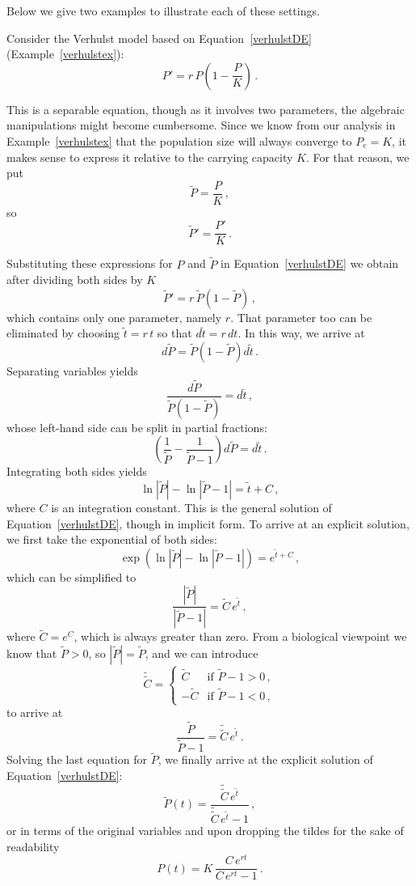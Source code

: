 Below we give two examples to illustrate each of these settings. 

\begin{example}
Consider the Verhulst model based on Equation~\eqref{verhulstDE} (Example~\ref{verhulstex}):
$$
P'=r\,P\left(1-\dfrac{P}{K}\right)\,.
$$

This is a separable equation, though as it involves two parameters, the algebraic manipulations might become cumbersome. Since we know from our analysis in Example~\ref{verhulstex} that the population size will always converge to $P_e=K$, it makes sense to express it relative to the carrying capacity $K$. For that reason, we put
$$
\widetilde{P}=\dfrac{P}{K}\,,
$$
so
$$
\widetilde{P}'=\dfrac{P'}{K}\,.
$$

Substituting these expressions for $P$ and $\widetilde{P}$ in  Equation~\eqref{verhulstDE} we obtain after dividing both sides by $K$
$$
\widetilde{P}'=r\,\widetilde{P}\left(1-\widetilde{P}\right)\,,
$$
which contains only one parameter, namely $r$. That parameter too can be eliminated by choosing $\tilde{t}=r\,t$ so that $d\tilde{t}=r\,d t$. In this way, we arrive at 
$$
d \widetilde{P}=\widetilde{P}\left(1-\widetilde{P}\right)d\tilde{t}\,.
$$
Separating variables yields
$$
\dfrac{d \widetilde{P}}{\widetilde{P}\left(1-\widetilde{P}\right)}=d\tilde{t}\,,
$$
whose left-hand side can be split in partial fractions:
$$
\left(\dfrac{1}{\widetilde{P}}-\dfrac{1}{\widetilde{P}-1}\right)d \widetilde{P}=d\tilde{t}\,.
$$
Integrating both sides yields
$$
\ln\left|\widetilde{P}\right|-\ln\left|\widetilde{P}-1\right|=\tilde{t}+C\,,
$$
where $C$ is an integration constant. This is the general solution of Equation~\eqref{verhulstDE}, though in implicit form. To arrive at an explicit solution, we first take the exponential of both sides:
$$
\exp\left(\ln\left|\widetilde{P}\right|-\ln\left|\widetilde{P}-1\right|\right)=e^{\tilde{t}+C}\,,
$$
which can be simplified to
$$
\dfrac{\left|\widetilde{P}\right|}{\left|\widetilde{P}-1\right|}=\widetilde{C}\,e^{\tilde t}\,,
$$
where $\widetilde{C}=e^C$, which is always greater than zero. From a biological viewpoint we know that $\widetilde{P}>0$, so $\left|\widetilde{P}\right|=\widetilde{P}$, and we can introduce
$$
\widetilde{\widetilde{C}}=\left\{\begin{array}{cl}
\widetilde{C}&\mbox{if } \widetilde{P}-1>0\,,\\
-\widetilde{C}&\mbox{if } \widetilde{P}-1<0\,,\end{array}\right.
$$
to arrive at
$$
\dfrac{\widetilde{P}}{\widetilde{P}-1}=\widetilde{\widetilde{C}}\,e^{\tilde t}\,.
$$
Solving the last equation for $\widetilde{P}$, we finally arrive at the explicit solution of Equation~\eqref{verhulstDE}:
$$
\widetilde{P}(t)=\dfrac{\widetilde{\widetilde{C}}\,e^{\tilde t}}{\widetilde{\widetilde{C}}\,e^{\tilde t}-1}\,, 
$$
or in terms of the original variables and upon dropping the tildes for the sake of readability
\begin{equation}
P(t)=K\,\dfrac{C\,e^{rt}}{C\,e^{rt}-1}\,.
\end{equation}
\end{example}

